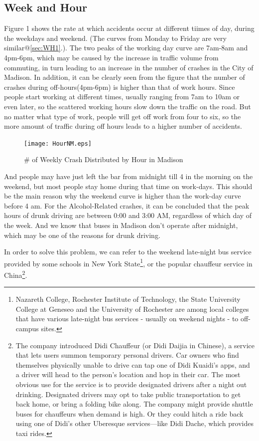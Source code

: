 \documentclass[15pt]{article}
\begin{document}
\subsection{Week and Hour}
\label{sec:WH}
Figure 1 shows the rate at which accidents occur at different tiimes of day, during the weekdays and weekend. (The curves from Monday to Friday are very similar@\ref{sec:WH1}.). The two peaks of the working day curve are 7am-8am and 4pm-6pm, which may be caused by the increase in traffic volume from commuting, in turn leading to an increase in the number of crashes in the City of Madison. In addition, it can be clearly seen from the figure that the number of crashes during off-hours(4pm-6pm) is higher than that of work hours. Since people start working at different times, usually ranging from 7am to 10am or even later, so the scattered working hours slow down the traffic on the road. But no matter what type of work, people will get off work from four to six, so the more amount of traffic during off hours leads to a higher number of accidents. 
\begin{figure}[H]
\centering
\texttt{[image: HourNM.eps]}
\caption{\# of Weekly Crash Distributed by Hour in Madison}
\label{1}
\end{figure}
 And people may have just left the bar from midnight till 4 in the morning on the weekend, but most people stay home during that time on work-days. This should be the main reason why the weekend curve is higher than the work-day curve before 4 am. For the Alcohol-Related crashes, it can be concluded that the peak hours of drunk driving are between 0:00 and 3:00 AM, regardless of which day of the week. And we know that buses in Madison don't operate after midnight, which may be one of the reasons for drunk driving.

In order to solve this problem, we can refer to the weekend late-night bus service provided by some schools in New York State\footnote{Nazareth College, Rochester Institute of Technology, the State University College at Geneseo and the University of Rochester are among local colleges that have various late-night bus services - usually on weekend nights - to off-campus sites.}, or the popular chauffeur service in China\footnote{The company introduced Didi Chauffeur (or Didi Daijia in Chinese), a service that lets users summon temporary personal drivers. Car owners who find themselves physically unable to drive can tap one of Didi Kuaidi's apps, and a driver will head to the person's location and hop in their car. The most obvious use for the service is to provide designated drivers after a night out drinking. Designated drivers may opt to take public transportation to get back home, or bring a folding bike along. The company might provide shuttle buses for chauffeurs when demand is high. Or they could hitch a ride back using one of Didi’s other Uberesque services—like Didi Dache, which provides taxi rides.}.
\end{document}
